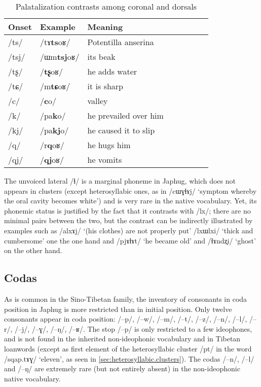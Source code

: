 \documentclass[oldfontcommands,oneside,a4paper,11pt]{article}
\newcommand{\ipa}[1]{/#1/} %
\begin{document}
      		   \begin{table}
 \caption{Palatalization contrasts among coronal and dorsals } \label{tab:coronal.dorsal}  \centering
\begin{tabular}{llllllll}
\toprule		
Onset & Example & Meaning \\
\midrule
      \ipa{ts} &      \ipa{tɤ\textbf{ts}oʁ}  & Potentilla anserina \\
      \ipa{tsj} &     \ipa{ɯm\textbf{tsj}oʁ}  & its beak \\
      \ipa{tʂ} &      \ipa{\textbf{tʂ}oʁ}  & he adds water \\
      \ipa{tɕ} &      \ipa{m\textbf{tɕ}oʁ}  &it is sharp\\
      \ipa{c} &      \ipa{\textbf{c}o}  & valley \\
      \ipa{k} &      \ipa{pa\textbf{k}o}  & he prevailed over him \\
      \ipa{kj} &      \ipa{pa\textbf{kj}o}  & he caused it to slip \\
      \ipa{q} &      \ipa{r\textbf{q}oʁ}  &he hugs him \\
      \ipa{qj} &      \ipa{\textbf{qj}oʁ}  & he vomits \\
      \bottomrule
\end{tabular}
\end{table}
 
The unvoiced lateral  \ipa{ɬ} is a marginal phoneme in Japhug, which does not appears in clusters (except heterosyllabic ones, as in \ipa{cɯɣɬɤj} `symptom whereby the oral cavity becomes white') and is very rare in the native vocabulary. Yet, its phonemic status is justified by the fact that it contrasts with \ipa{lx}; there are no minimal pairs between the two, but the contrast can be indirectly illustrated by examples such as \ipa{alxɤj} `(his clothes) are not properly put' \ipa{lxɯlxi} `thick and cumbersome' one the one hand and \ipa{pjɤɬɤt} `he became old' and \ipa{ɬɤndʐi} `ghost' on the other hand.





      \subsection{Codas} \label{sec:coda}
   As is common in the Sino-Tibetan family, the inventory of consonants in coda position in Japhug is more restricted than in initial position.  Only twelve   consonants appear in coda position:  \ipa{--p}, \ipa{--w}, \ipa{--m}, \ipa{--t}, \ipa{--z}, \ipa{--n}, \ipa{--l}, \ipa{--r}, \ipa{--j}, \ipa{--ɣ}, \ipa{--ŋ}, \ipa{--ʁ}. The stop \ipa{--p} is only restricted to a few ideophones, and is not found in the inherited non-ideophonic vocabulary and in Tibetan loanwords (except as first element of the heterosyllabic cluster \ipa{pt} in the word \ipa{sqap.tɤɣ} `eleven', as seen in \ref{sec:heterosyllabic.clusters}). The codas \ipa{--n}, \ipa{--l} and \ipa{--ŋ} are extremely rare (but not entirely absent) in the non-ideophonic native vocabulary. 
    
\end{document}
